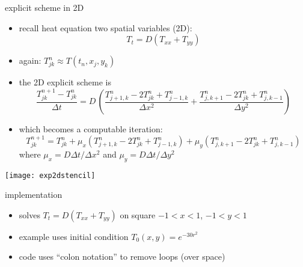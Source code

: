 \begin{frame}{explicit scheme in 2D}

\begin{itemize}
\item recall heat equation two spatial variables (2D):
    $$T_t = D(T_{xx} + T_{yy})$$
\item again: $T_{jk}^n \approx T(t_n,x_j,y_k)$
\item the 2D explicit scheme is
\small
	$$\frac{T_{jk}^{n+1} - T_{jk}^n}{\Delta t} = D\,\left(\frac{T_{j+1,k}^n - 2 T_{jk}^n + T_{j-1,k}^n}{\Delta x^2} + \frac{T_{j,k+1}^n - 2 T_{jk}^n + T_{j,k-1}^n}{\Delta y^2}\right)$$
\normalsize
\item which becomes a computable iteration:
\small
	$$T_{jk}^{n+1} = T_{jk}^n + \mu_x (T_{j+1,k}^n - 2 T_{jk}^n + T_{j-1,k}^n) + \mu_y (T_{j,k+1}^n - 2 T_{jk}^n + T_{j,k-1}^n)$$
\normalsize
where $\mu_x=D\Delta t/\Delta x^2$ and $\mu_y = D\Delta t/\Delta y^2$
\end{itemize}

\begin{center}
\texttt{[image: exp2dstencil]}
\end{center}
\end{frame}


\begin{frame}{implementation}
\label{slide:heatmatlab}


\small
\begin{itemize}
\item solves $T_t = D(T_{xx} + T_{yy})$ on square $-1 < x < 1$, $-1 < y < 1$
\item example uses initial condition $T_0(x,y) = e^{-30 r^2}$
\item code uses ``colon notation'' to remove loops (over space)
\end{itemize}
\end{frame}


